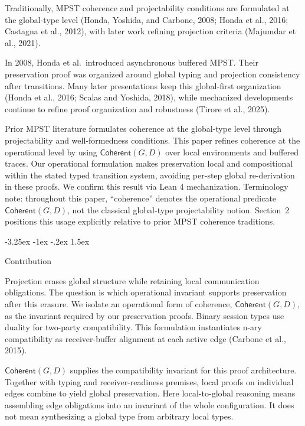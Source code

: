 \documentclass[a4paper,10pt,twocolumn,english]{article}
\makeatletter
\renewcommand{\subsection}{\@startsection{subsection}{2}{\z@}%
  {-3.25ex \@plus -1ex \@minus -.2ex}%
  {1.5ex}%
  {\raggedright\normalfont\normalsize\bfseries}}
\numberwithin{equation}{section}
\theoremstyle{paperdef}
\theoremstyle{paperplain}
\theoremstyle{paperdef}
\theoremstyle{paperremark}
\newcommand{\Coherent}{\ensuremath{\mathsf{Coherent}}}
\makeatother
\begin{document}
Traditionally, MPST coherence and projectability conditions are formulated at the global-type level (Honda,
Yoshida, and Carbone, 2008; Honda et al., 2016; Castagna et al., 2012), with later work
refining projection criteria (Majumdar et al., 2021).

In 2008, Honda et al.\ introduced asynchronous buffered MPST. Their preservation proof was organized
around global typing and projection consistency after transitions. Many later presentations keep this
global-first organization (Honda et al., 2016; Scalas and Yoshida, 2018), while
mechanized developments continue to refine proof organization and robustness (Tirore et al., 2025).

Prior MPST literature formulates coherence at the global-type level through projectability and
well-formedness conditions. This paper refines coherence at the operational level by using
$\Coherent(G,D)$ over local environments and buffered traces. Our operational formulation makes
preservation local and compositional within the stated typed transition system, avoiding
per-step global re-derivation in these proofs. We confirm this result via Lean 4 mechanization.
Terminology note: throughout this paper, ``coherence'' denotes the operational predicate
$\Coherent(G,D)$, not the classical global-type projectability notion. Section~2 positions this
usage explicitly relative to prior MPST coherence traditions.

\subsection{Contribution}

Projection erases global structure while retaining local communication obligations.
The question is which operational invariant supports preservation after this erasure. We isolate an operational form of
coherence, $\Coherent(G,D)$, as the invariant required by our preservation proofs.
Binary session types use duality for two-party compatibility. This formulation instantiates n-ary
compatibility as receiver-buffer alignment at each active edge (Carbone et al., 2015).

$\Coherent(G,D)$ supplies the compatibility invariant for this proof architecture. Together with
typing and receiver-readiness premises, local proofs on individual edges combine to yield global
preservation. Here local-to-global reasoning means assembling edge obligations into an invariant
of the whole configuration. It does not mean synthesizing a global type from arbitrary local types.
\end{document}
